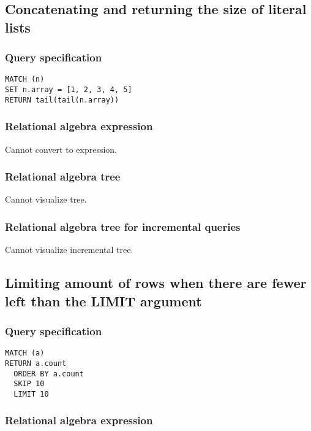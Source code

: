 \subsection{Concatenating and returning the size of literal lists}

\subsubsection*{Query specification}

\begin{lstlisting}
MATCH (n)
SET n.array = [1, 2, 3, 4, 5]
RETURN tail(tail(n.array))
\end{lstlisting}

\subsubsection*{Relational algebra expression}

Cannot convert to expression.

\subsubsection*{Relational algebra tree}

Cannot visualize tree.

\subsubsection*{Relational algebra tree for incremental queries}

Cannot visualize incremental tree.

\subsection{Limiting amount of rows when there are fewer left than the LIMIT argument}

\subsubsection*{Query specification}

\begin{lstlisting}
MATCH (a)
RETURN a.count
  ORDER BY a.count
  SKIP 10
  LIMIT 10
\end{lstlisting}

\subsubsection*{Relational algebra expression}

